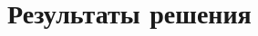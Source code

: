\documentclass[../homework.tex]{subfiles}
\begin{document}
\section{Результаты решения}

\blindtext[5]
\end{document}
